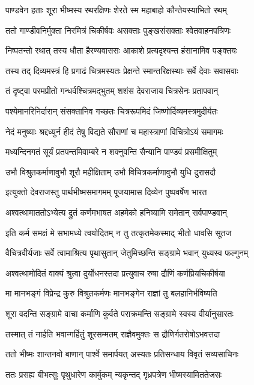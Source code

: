 \twolineshloka
{पाण्डवेन हताः शूरा भीष्मस्य रथरक्षिणः}
{शेरते स्म महाबाहो कौन्तेयस्याभितो रथम्}


\twolineshloka
{ततो गाण्डीवनिर्मुक्ता निरमित्रं चिकीर्षवः}
{असक्ताः पुङ्खसंसक्ताः श्वेतवाहनपत्रिणः}


\twolineshloka
{निष्पतन्तो रथात् तस्य धौता हैरण्यवाससः}
{आकाशे प्रत्यदृश्यन्त हंसानामिव पङ्क्तयः}


\twolineshloka
{तस्य तद् दिव्यमस्त्रं हि प्रगाढं चित्रमस्यतः}
{प्रेक्षन्ते स्मान्तरिक्षस्थाः सर्वे देवाः सवासवाः}


\twolineshloka
{तं दृष्ट्वा परमप्रीतो गन्धर्वश्चित्रमद्भुतम्}
{शशंस देवराजाय चित्रसेनः प्रतापवान्}


\twolineshloka
{पश्येमानरिनिर्दारान् संसक्तानिव गच्छतः}
{चित्ररूपमिदं जिष्णोर्दिव्यमस्त्रमुदीर्यतः}


\twolineshloka
{नेदं मनुष्याः श्रद्दध्युर्न हीदं तेषु विद्यते}
{सौराणां च महास्त्राणां विचित्रोऽयं समागमः}


\twolineshloka
{मध्यन्दिनगतं सूर्यं प्रतपन्तमिवाम्बरे}
{न शक्नुवन्ति सैन्यानि पाण्डवं प्रसमीक्षितुम्}


\twolineshloka
{उभौ विश्रुतकर्माणावुभौ शूरौ महीक्षिताम्}
{उभौ विचित्रकर्माणावुभौ युधि दुरासदौ}


\twolineshloka
{इत्युक्तो देवराजस्तु पार्थभीष्मसमागमम्}
{पूजयामास दिव्येन पुष्पवर्षेण भारत}


\twolineshloka
{अश्वत्थामाततोऽभ्येत्य द्रुतं कर्णमभाषत}
{अहमेको हनिष्यामि समेतान् सर्वपाण्डवान्}


\twolineshloka
{इति कर्म समक्षं मे सभामध्ये त्वयोदितम्}
{न तु तत्कृतमेकस्माद् भीतो धावसि सूतज}


\twolineshloka
{वैचित्रवीर्यजाः सर्वे त्वामाश्रित्य पृथासुतान्}
{जेतुमिच्छन्ति सङ्ग्रामे भवान् युध्यस्व फल्गुनम्}


\twolineshloka
{अश्वत्थामोदितं वाक्यं श्रुत्वा दुर्योधनस्तदा}
{प्रत्युवाच रुषा द्रौणिं कर्णप्रियचिकीर्षया}


\twolineshloka
{मा मानभङ्गं विप्रेन्द्र कुरु विश्रुतकर्मणः}
{मानभङ्गेन राज्ञां तु बलहानिर्भविष्यति}


\twolineshloka
{शूरा वदन्ति सङ्ग्रामे वाचा कर्माणि कुर्वते}
{पराक्रमन्ति सङ्ग्रामे स्वस्य वीर्यानुसारतः}


\twolineshloka
{तस्मात् तं नार्हति भवान्गर्हितुं शूरसम्मतम्}
{राज्ञैवमुक्तः स द्रौणिर्गतरोषोऽभवत्तदा}


\twolineshloka
{ततो भीष्मः शान्तनवो बाणान् पार्श्वे समार्पयत्}
{अस्यतः प्रतिसन्धाय विवृतं सव्यसाचिनः}


\twolineshloka
{ततः प्रसह्य बीभत्सुः पृथुधारेण कार्मुकम्}
{न्यकृन्तद् गृध्रपत्रेण भीष्मस्यामिततेजसः}


